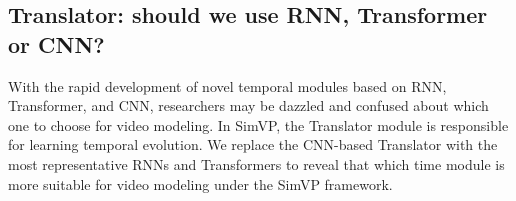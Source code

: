 \documentclass[10pt,twocolumn,letterpaper]{article}
\begin{document}
\begin{table}[h]
  \small
  \centering
  \caption{Computation comparision on Moving MNIST. We report the per sample memory overhead, per frame FLOPs, and total training time. For methods marked with , we report the results reproduced by their official codes. Other results refer to \cite{yu2019efficient}. }
  
  \label{tab:cmp_computation_mmnist}
\end{table}

\vspace{-2mm}
\subsection{ Translator: should we use RNN, Transformer or CNN?}
With the rapid development of novel temporal modules based on RNN, Transformer, and CNN, researchers may be dazzled and confused about which one to choose for video modeling. In SimVP, the Translator module is responsible for learning temporal evolution. We replace the CNN-based Translator with the most representative RNNs and Transformers to reveal that which time module is more suitable for video modeling under the SimVP framework.

\vspace{-3mm}
\end{document}

